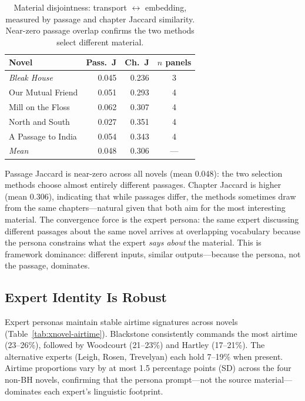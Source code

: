 \documentclass[final]{clv2025}
\begin{document}
\begin{table}[t]
\caption{Material disjointness: transport $\leftrightarrow$ embedding,
  measured by passage and chapter Jaccard similarity.  Near-zero passage
  overlap confirms the two methods select different material.}
\label{tab:material}
\begin{tabular}{lrrc}
\toprule
Novel & Pass.\ J & Ch.\ J & $n$ panels \\
\midrule
\textit{Bleak House}    & 0.045 & 0.236 & 3 \\
Our Mutual Friend       & 0.051 & 0.293 & 4 \\
Mill on the Floss       & 0.062 & 0.307 & 4 \\
North and South         & 0.027 & 0.351 & 4 \\
A Passage to India      & 0.054 & 0.343 & 4 \\
\midrule
\textit{Mean}           & 0.048 & 0.306 & --- \\
\bottomrule
\end{tabular}
\end{table}

Passage Jaccard is near-zero across all novels (mean 0.048): the two
selection methods choose almost entirely different passages.  Chapter
Jaccard is higher (mean 0.306), indicating that while passages differ,
the methods sometimes draw from the same chapters---natural given that
both aim for the most interesting material.  The convergence force is
the expert persona: the same expert discussing different passages about
the same novel arrives at overlapping vocabulary because the persona
constrains what the expert \emph{says about} the material.  This is
framework dominance: different inputs, similar outputs---because
the persona, not the passage, dominates.


\subsection{Expert Identity Is Robust}
\label{sec:identity}

Expert personas maintain stable airtime signatures across novels
(Table~\ref{tab:xnovel-airtime}).  Blackstone consistently commands
the most airtime (23--26\%), followed by Woodcourt (21--23\%) and
Hartley (17--21\%).  The alternative experts (Leigh, Rosen, Trevelyan)
each hold 7--19\% when present.  Airtime proportions vary by at most
1.5 percentage points (SD) across the four non-BH novels, confirming
that the persona prompt---not the source material---dominates each
expert's linguistic footprint.
\end{document}

